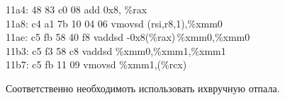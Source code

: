 \documentclass[a4peper, 12pt, titlepage, finall]{extreport}
\begin{document}
    {
        \setlength{\parindent}{0em}

        {
            \setlength{\leftskip}{3em} \ttfamily
            11a4:	48 83 c0 08          	add    0x8, \%rax \\
            11a8:	c4 a1 7b 10 04 06    	vmovsd (rsi,r8,1),\%xmm0\\
            11ae:	c5 fb 58 40 f8       	vaddsd -0x8(\%rax)\,\%xmm0,\%xmm0\\
            11b3:	c5 f3 58 c8          	vaddsd \%xmm0,\%xmm1,\%xmm1\\
            11b7:	c5 fb 11 09          	vmovsd \%xmm1,(\%rcx) \\
    
        }
    }
    Соответственно необходимоть использовать ихвручную отпала.
\end{document}
